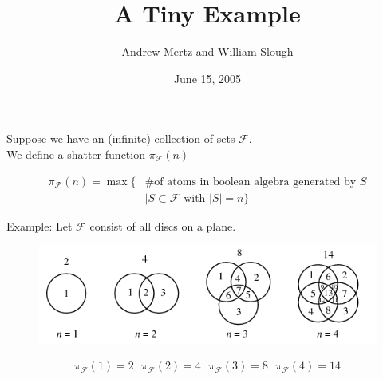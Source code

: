 \documentclass{beamer}
\title{A Tiny Example}
\author{Andrew Mertz and William Slough}
\date{June 15, 2005}
\newcommand{\F}{\mathcal F}
\begin{document}
\maketitle

\begin{frame}
	Suppose we have an (infinite) collection of sets $\F$. \\
	We define a shatter function $\pi_\F(n)$

	\begin{align*}
		\pi_\F(n) = \max \{ &\text {\# of atoms in boolean algebra generated by $S$} \\
		            &\mid S \subset \F \text{ with } |S| = n\}
	\end{align*}
\end{frame}

\begin{frame}
	Example: Let $\F$ consist of all discs on a plane.
	\begin{figure}[p]
    \centering
    \includegraphics[scale=0.75]{circle.png}
	\end{figure}
	\begin{align*}
		\pi_\F(1) = 2 \ \ \  \pi_\F(2) = 4 \ \ \  \pi_\F(3) = 8  \ \ \ \pi_\F(4) = 14
	\end{align*}
\end{frame}
\end{document}
